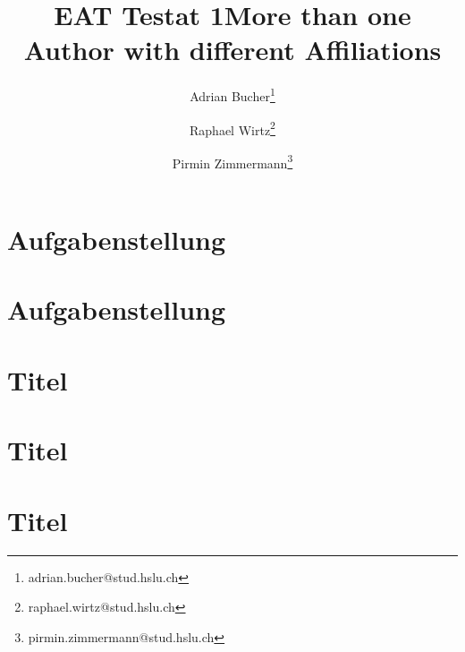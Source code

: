 \documentclass[a4paper,11pt,oneside]{book}
\title{EAT Testat 1}
\begin{document}
\pagestyle{plain}

\title{More than one Author with different Affiliations}
\author[1]{Adrian Bucher\thanks{adrian.bucher@stud.hslu.ch}}
\author[2]{Raphael Wirtz\thanks{raphael.wirtz@stud.hslu.ch}}
\author[1,2]{Pirmin Zimmermann\thanks{pirmin.zimmermann@stud.hslu.ch}}

\thispagestyle{empty}
\begin{titlepage}	%

\end{titlepage}
\clearpage 

\frontmatter	%

\tableofcontents
\clearpage

\listoffigures
{}
\clearpage

\listoftables
{}
\clearpage


%

\chapter{Aufgabenstellung}

\mainmatter		%
\chapter{Aufgabenstellung}
\clearpage

\chapter{Titel}
\clearpage

\chapter{Titel}
\clearpage

\chapter{Titel}
\clearpage
\end{document}
